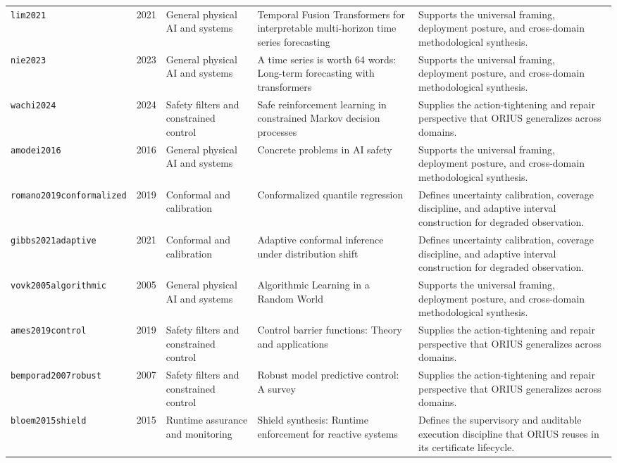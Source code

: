 \begin{longtable}{p{}p{}p{}p{}p{}}
\texttt{lim2021} & 2021 & General physical AI and systems & Temporal Fusion Transformers for interpretable multi-horizon time series forecasting & Supports the universal framing, deployment posture, and cross-domain methodological synthesis.\\
\texttt{nie2023} & 2023 & General physical AI and systems & A time series is worth 64 words: Long-term forecasting with transformers & Supports the universal framing, deployment posture, and cross-domain methodological synthesis.\\
\texttt{wachi2024} & 2024 & Safety filters and constrained control & Safe reinforcement learning in constrained Markov decision processes & Supplies the action-tightening and repair perspective that ORIUS generalizes across domains.\\
\texttt{amodei2016} & 2016 & General physical AI and systems & Concrete problems in AI safety & Supports the universal framing, deployment posture, and cross-domain methodological synthesis.\\
\texttt{romano2019conformalized} & 2019 & Conformal and calibration & Conformalized quantile regression & Defines uncertainty calibration, coverage discipline, and adaptive interval construction for degraded observation.\\
\texttt{gibbs2021adaptive} & 2021 & Conformal and calibration & Adaptive conformal inference under distribution shift & Defines uncertainty calibration, coverage discipline, and adaptive interval construction for degraded observation.\\
\texttt{vovk2005algorithmic} & 2005 & General physical AI and systems & Algorithmic Learning in a Random World & Supports the universal framing, deployment posture, and cross-domain methodological synthesis.\\
\texttt{ames2019control} & 2019 & Safety filters and constrained control & Control barrier functions: Theory and applications & Supplies the action-tightening and repair perspective that ORIUS generalizes across domains.\\
\texttt{bemporad2007robust} & 2007 & Safety filters and constrained control & Robust model predictive control: A survey & Supplies the action-tightening and repair perspective that ORIUS generalizes across domains.\\
\texttt{bloem2015shield} & 2015 & Runtime assurance and monitoring & Shield synthesis: Runtime enforcement for reactive systems & Defines the supervisory and auditable execution discipline that ORIUS reuses in its certificate lifecycle.\\

\end{longtable}
